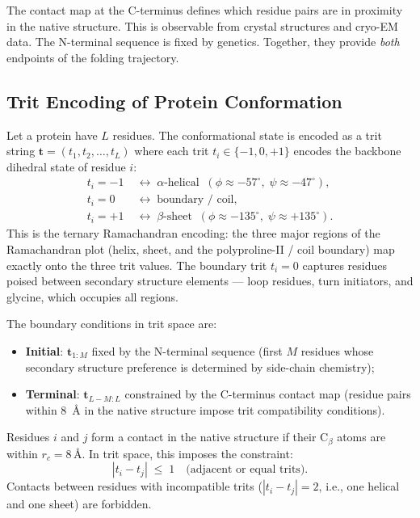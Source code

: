 The contact map at the C-terminus defines which residue pairs are in
proximity in the native structure.  This is observable from crystal
structures and cryo-EM data.  The N-terminal sequence is fixed by genetics.
Together, they provide \emph{both} endpoints of the folding trajectory.

\subsection{Trit Encoding of Protein Conformation}

Let a protein have $L$ residues.  The conformational state is encoded as a
trit string $\mathbf{t} = (t_1, t_2, \ldots, t_L)$ where each trit $t_i
\in \{-1, 0, +1\}$ encodes the backbone dihedral state of residue $i$:
\begin{align}
\label{eq:ch05-trit-fold}
    t_i = -1 &\;\leftrightarrow\; \text{$\alpha$-helical} \;\;
               (\phi \approx -57^\circ,\; \psi \approx -47^\circ), \\
    t_i =  0 &\;\leftrightarrow\; \text{boundary / coil}, \\
    t_i = +1 &\;\leftrightarrow\; \text{$\beta$-sheet} \;\;
               (\phi \approx -135^\circ,\; \psi \approx +135^\circ).
\end{align}
This is the ternary Ramachandran encoding: the three major regions of the
Ramachandran plot (helix, sheet, and the polyproline-II / coil boundary)
map exactly onto the three trit values.  The boundary trit $t_i = 0$
captures residues poised between secondary structure elements --- loop
residues, turn initiators, and glycine, which occupies all regions.

The boundary conditions in trit space are:
\begin{itemize}
    \item \textbf{Initial}: $\mathbf{t}_{1:M}$ fixed by the N-terminal
          sequence (first $M$ residues whose secondary structure preference
          is determined by side-chain chemistry);
    \item \textbf{Terminal}: $\mathbf{t}_{L-M:L}$ constrained by the
          C-terminus contact map (residue pairs within 8~\AA{} in the
          native structure impose trit compatibility conditions).
\end{itemize}

\begin{definition}
\label{def:ch05-contact}
Residues $i$ and $j$ form a contact in the native structure if their
C$_\beta$ atoms are within $r_c = 8\,\text{\AA}$.  In trit space, this
imposes the constraint:
\begin{equation}
\label{eq:ch05-contact-constraint}
    |t_i - t_j| \;\leq\; 1 \quad \text{(adjacent or equal trits)}.
\end{equation}
Contacts between residues with incompatible trits ($|t_i - t_j| = 2$,
i.e., one helical and one sheet) are forbidden.
\end{definition}

